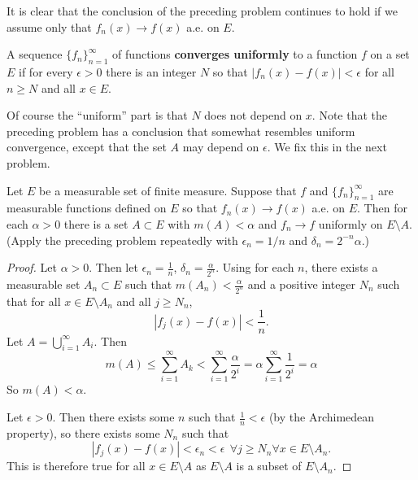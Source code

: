 \begin{rmk}%
	It is clear that the conclusion of the preceding problem continues to hold 
	if we assume only that $f_n(x) \rightarrow f(x)$ a.e. on $E$. 
\end{rmk}

\begin{defn}\label{convergeuniformly}%
	A sequence $\{f_n\}_{n=1}^\infty$ of functions \textbf{converges uniformly} 
	to a function $f$ on a set $E$ if for every $\epsilon > 0$ there is an 
	integer $N$ so that $|f_n(x) - f(x)| < \epsilon$ for all $n \ge N$ and 
	all $x \in E$. 

	Of course the ``uniform'' part is that $N$ does not depend on $x$. Note 
	that the preceding problem has a conclusion that somewhat resembles uniform 
	convergence, except that the set $A$ may depend on $\epsilon$. We fix this 
	in the next problem. 
\end{defn}

\begin{pblm}\label{p:egoroff}%
	Let $E$ be a measurable set of finite measure. Suppose that $f$ and 
	$\{f_n\}_{n=1}^\infty$ are measurable functions defined on $E$ so that 
	$f_n(x) \rightarrow f(x)$ a.e. on $E$. Then for each $\alpha > 0$ there is 
	a set $A \subset E$ with $m(A) < \alpha$ and $f_n \rightarrow f$ uniformly 
	on $E\setminus A$. \\ (Apply the preceding problem repeatedly with 
	$\epsilon_n = 1/n$ and $\delta_n = 2^{-n}\alpha$.)
\begin{proof}
	Let $\alpha > 0$. Then let $\epsilon_n = \frac{1}{n}$, $\delta_n = \frac{\alpha}{2^n}$. 
	Using  for each $n$, there exists a measurable 
	set $A_n \subset E$ such that $m(A_n) < \frac{\alpha}{2^n}$ and a positive 
	integer $N_n$ such that for all $x \in E\setminus A_n$ and all $j \ge N_n$, 
	\begin{equation*}
		|f_j(x) - f(x)| < \frac{1}{n}. 
	\end{equation*}
	Let $A = \bigcup\limits_{i=1}^\infty A_i$. Then 
	\begin{equation*}
		m(A) \le \sum\limits_{i=1}^\infty A_k < \sum\limits_{i=1}^\infty\frac{\alpha}{2^i} = \alpha \sum\limits_{i=1}^\infty \frac{1}{2^i} = \alpha
	\end{equation*} 
	So $m(A) < \alpha$. 

	Let $\epsilon > 0$. Then there exists some $n$ such that $\frac{1}{n} < \epsilon$ 
	(by the Archimedean property), so there exists some $N_n$ such that 
	\begin{equation*}
		|f_j(x) - f(x)| < \epsilon_n < \epsilon ~~\forall j \ge N_n \forall x \in E\setminus A_n. 
	\end{equation*}
	This is therefore true for all $x \in E\setminus A$ as $E\setminus A$ is a 
	subset of $E \setminus A_n$. 
\end{proof}
\end{pblm}

